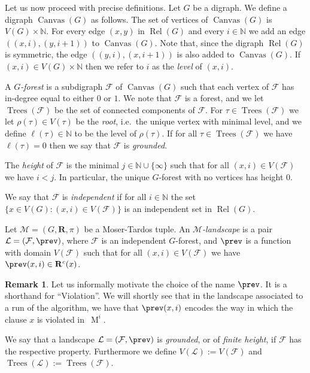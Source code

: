 \documentclass[12pt,a4paper]{article}
\numberwithin{equation}{section}
\theoremstyle{definition}
\newtheorem{remark}[equation]{Remark}
\newenvironment{myrem}{%
        \begin{mdframed}[%
            linewidth=4pt, 
            topline=false, 
            bottomline=false, 
            rightline=false,%
            leftmargin=0pt, 
            innerleftmargin=0.4em, 
            rightmargin=0pt, 
            innerrightmargin=0pt, 
            innertopmargin=0pt ,%
            innerbottommargin=0pt, 
            splittopskip=\topskip, 
            splitbottomskip=0.3\topskip, %
            ]%
        \begin{remark}
    }{%
        \end{remark}
        \end{mdframed}
    }
\newcommand\N{\mathbb N}
\newcommand\NN{\mathbb N}
\renewcommand{\cal}[1]{{\mathcal #1}}
\newcommand\MT{\operatorname{M}}
\newcommand\Rel{\operatorname{Rel}}
\newcommand{\Canvas}{\operatorname{Canvas}}
\newcommand{\Trees}{\operatorname{Trees}}
\begin{document}
    Let us now proceed with precise definitions. Let $G$ be a digraph. We define a digraph $\Canvas(G)$ as follows. The set of vertices of $\Canvas(G)$ is $V(G)\times \N$. For every edge $(x,y)$ in $\Rel (G)$  and every $i\in \NN$ we add an edge $((x,i), (y,i+1))$ to $\Canvas(G)$. Note that, since the digraph $\Rel (G)$ is symmetric, the edge $((y,i), (x,i+1))$ is also added  to $\Canvas(G)$.    
    If $(x,i)\in V(G)\times \NN$  then we refer to $i$ as the \emph{level} of $(x,i)$. 
    
    A \emph{$G$-forest} is a subdigraph $\cal F$ of $\Canvas(G)$ such that each vertex of $\cal F$ has in-degree equal to either $0$ or $1$.  We note that $\cal F$ is a forest, and we let $\Trees(\cal F)$ be the set of connected components of $\cal F$. For $\tau \in \Trees(\cal F)$ we let $\rho(\tau) \in V(\tau)$ be the \emph{root}, i.e.~the unique vertex with minimal level, and we define $\ell(\tau)\in \NN$ to be the level of $\rho(\tau)$.  If for all $\tau\in \Trees(\cal F)$ we have $\ell(\tau)=0$ then we say that $\cal F$ is \emph{grounded}.
    
    The \emph{height} of $\cal F$ is the minimal $j\in \NN\cup\{\infty\}$ such that for all $(x,i)\in V(\cal F)$  we have $i< j$. In particular,  the unique $G$-forest with no vertices has height $0$. 
    
    We say that $\cal F$ is \emph{independent} if for all $i\in \NN$ the set $\{x\in V(G)\colon (x,i)\in V(\cal F)\}$ is an independent set in $\Rel(G)$. 
    
    Let $\cal M=(G, \mathbf R, \pi)$ be a Moser-Tardos tuple. An \emph{$\cal M$-landscape} is a pair $\cal L =(\cal F,\prev)$, where $\cal F$ is an independent $G$-forest,  and $\prev$ is a function with domain $V(\cal F)$ such that  for all $(x,i) \in V(\cal F)$ we have $\prev(x,i)\in \mathbf R^c(x)$.  
    
    \begin{myrem} Let us informally motivate the choice of the name $\prev$. It is a shorthand for ``Violation''. We will shortly see that in the landscape associated to a run of the algorithm, we have that  $\prev(x,i)$ encodes the way in which the clause $x$ is violated in~$\MT^i$.
    \end{myrem} 
    
    We say that a landscape $\cal L=(\cal F,\prev)$ is \emph{grounded}, or of \emph{finite height}, if $\cal F$ has the respective property. Furthermore we define $V(\cal L) := V(\cal F)$ and $\Trees(\cal L) :=\Trees(\cal F)$.
    
\end{document}
